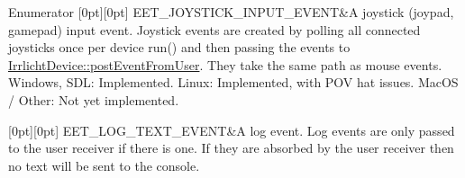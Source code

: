\begin{DoxyEnumFields}{Enumerator}
[0pt][0pt]{}\mbox{\label{namespaceirr_ac9eed96e06e85ce3c86fcbbbe9e48a0cac81558e4607ad260e96ae0f7b889e9a5}} 
E\+E\+T\+\_\+\+J\+O\+Y\+S\+T\+I\+C\+K\+\_\+\+I\+N\+P\+U\+T\+\_\+\+E\+V\+E\+NT&A joystick (joypad, gamepad) input event. Joystick events are created by polling all connected joysticks once per device run() and then passing the events to \hyperlink{classirr_1_1IrrlichtDevice_abf859e39f017b0403c6ed331e48e01df}{Irrlicht\+Device\+::post\+Event\+From\+User}. They take the same path as mouse events. Windows, S\+DL\+: Implemented. Linux\+: Implemented, with P\+OV hat issues. Mac\+OS / Other\+: Not yet implemented. \\
\hline

[0pt][0pt]{}\mbox{\label{namespaceirr_ac9eed96e06e85ce3c86fcbbbe9e48a0ca8553b889c8da285c96b90116ae019952}} 
E\+E\+T\+\_\+\+L\+O\+G\+\_\+\+T\+E\+X\+T\+\_\+\+E\+V\+E\+NT&A log event. Log events are only passed to the user receiver if there is one. If they are absorbed by the user receiver then no text will be sent to the console. \\
\hline


\end{DoxyEnumFields}
